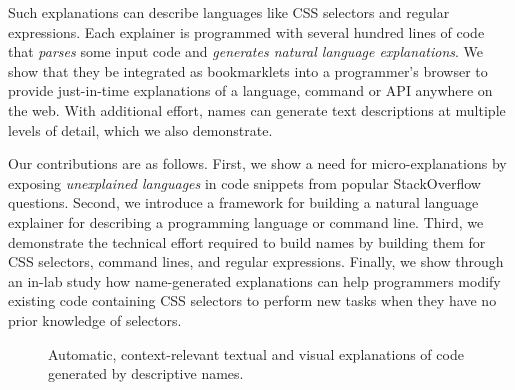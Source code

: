 Such explanations can describe languages like CSS selectors and regular expressions.
Each explainer is programmed with several hundred lines of code that \emph{parses} some input code and \emph{generates natural language explanations}.
We show that they be integrated as bookmarklets into a programmer's browser to provide just-in-time explanations of a language, command or API anywhere on the web.
With additional effort, \glspl{name} can generate text descriptions at multiple levels of detail, which we also demonstrate.

Our contributions are as follows.
First, we show a need for micro-explanations by exposing \emph{unexplained languages} in code snippets from popular StackOverflow questions.
Second, we introduce a framework for building a natural language explainer for describing a programming language or command line.
Third, we demonstrate the technical effort required to build \glspl{name} by building them for CSS selectors, command lines, and regular expressions.
Finally, we show through an in-lab study how \gls{name}-generated explanations can help programmers modify existing code containing CSS selectors to perform new tasks when they have no prior knowledge of selectors. 

\begin{figure}[!t]
\label{fig:tutorons}
\caption{Automatic, context-relevant textual and visual explanations of code generated by descriptive \glspl{name}.}
\end{figure}
